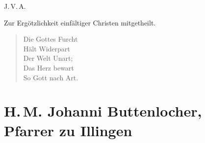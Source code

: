 \begin{center}
J.\,V.\,A.
\end{center}

\begin{center}
Zur Ergötzlichkeit einfältiger Christen mitgetheilt.
\end{center}

\begin{verse}
Die Gottes Furcht\\
Hält Widerpart\\
Der Welt Unart;\\
Das Herz bewart\\
So Gott nach Art.
\end{verse}


\section[H.\,M. Johanni Buttenlocher]{H.\,M. Johanni Buttenlocher, Pfarrer zu Illingen}

